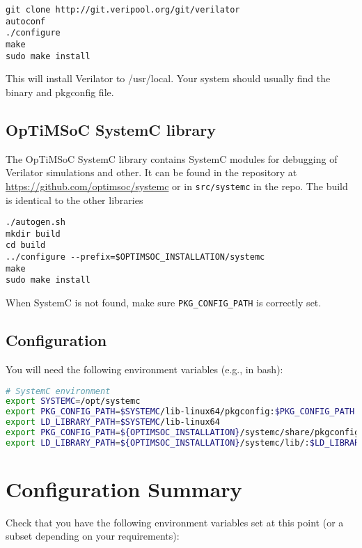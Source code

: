 \begin{lstlisting}
git clone http://git.veripool.org/git/verilator
autoconf
./configure
make
sudo make install
\end{lstlisting}

This will install Verilator to /usr/local. Your system should usually
find the binary and pkgconfig file.

\subsection{OpTiMSoC SystemC library}

The OpTiMSoC SystemC library contains SystemC modules for debugging of
Verilator simulations and other. It can be found in the repository at
\url{https://github.com/optimsoc/systemc} or in \texttt{src/systemc}
in the repo. The build is identical to the other libraries

\begin{lstlisting}
./autogen.sh
mkdir build
cd build
../configure --prefix=$OPTIMSOC_INSTALLATION/systemc
make
sudo make install
\end{lstlisting}

When SystemC is not found, make sure \verb|PKG_CONFIG_PATH| is
correctly set.

\subsection{Configuration}

You will need the following environment variables (e.g., in bash):

\begin{lstlisting}[language=bash]
# SystemC environment
export SYSTEMC=/opt/systemc
export PKG_CONFIG_PATH=$SYSTEMC/lib-linux64/pkgconfig:$PKG_CONFIG_PATH
export LD_LIBRARY_PATH=$SYSTEMC/lib-linux64
export PKG_CONFIG_PATH=${OPTIMSOC_INSTALLATION}/systemc/share/pkgconfig:$PKG_CONFIG_PATH
export LD_LIBRARY_PATH=${OPTIMSOC_INSTALLATION}/systemc/lib/:$LD_LIBRARY_PATH
\end{lstlisting}

\section{Configuration Summary}

Check that you have the following environment variables set at this
point (or a subset depending on your requirements):

